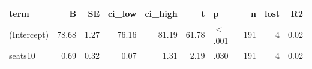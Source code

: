 \begin{tabular}{lrrrrrlrrr}
  \toprule
term & B & SE & ci\_low & ci\_high & t & p & n & lost & R2 \\ 
  \midrule
(Intercept) & 78.68 & 1.27 & 76.16 & 81.19 & 61.78 & $<$ .001 & 191 &   4 & 0.02 \\ 
  seats10 & 0.69 & 0.32 & 0.07 & 1.31 & 2.19 & .030 & 191 &   4 & 0.02 \\ 
   \bottomrule
\end{tabular}
